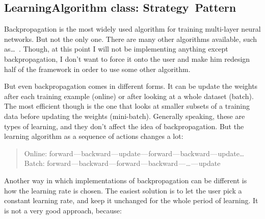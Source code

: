 \subsection{LearningAlgorithm class: Strategy Pattern}
Backpropagation is the most widely used algorithm for training multi-layer neural networks. But not the only one. There are many other algorithms available, such as… . Though, at this point I will not be implementing anything except backpropagation, I don’t want to force it onto the user and make him redesign half of the framework in order to use some other algorithm.

But even backpropagation comes in different forms. It can be update the weights after each training example (online) or after looking at a whole dataset (batch). The most efficient though is the one that looks at smaller subsets of a training data before updating the weights (mini-batch). Generally speaking, these are types of learning, and they don’t affect the idea of backpropagation. But the learning algorithm as a sequence of actions changes a lot:

\begin{quote}
Online: forward — backward — update — forward — backward — update…
Batch: forward — backward — forward — backward — … — update
\end{quote}

Another way in which implementations of backpropagation can be different is how the learning rate is chosen. The easiest solution is to let the user pick a constant learning rate, and keep it unchanged for the whole period of learning. It is not a very good approach, because:

